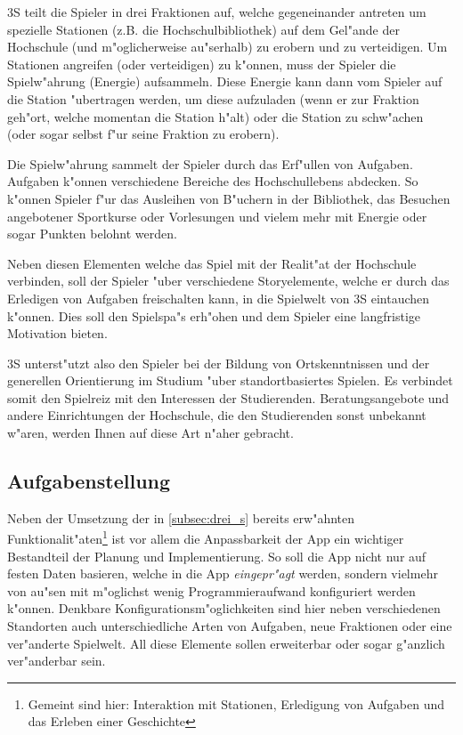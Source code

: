 \documentclass{article}
\begin{document}
3S teilt die Spieler in drei Fraktionen auf, welche gegeneinander antreten um spezielle Stationen (z.B. die Hochschulbibliothek) auf dem Gel"ande der Hochschule (und m"oglicherweise au"serhalb) zu erobern und zu verteidigen. Um Stationen angreifen (oder verteidigen) zu k"onnen, muss der Spieler die Spielw"ahrung (Energie) aufsammeln. Diese Energie kann dann vom Spieler auf die Station "ubertragen werden, um diese aufzuladen (wenn er zur Fraktion geh"ort, welche momentan die Station h"alt) oder die Station zu schw"achen (oder sogar selbst f"ur seine Fraktion zu erobern).

Die Spielw"ahrung sammelt der Spieler durch das Erf"ullen von Aufgaben. Aufgaben k"onnen verschiedene Bereiche des Hochschullebens abdecken. So k"onnen Spieler f"ur das Ausleihen von B"uchern in der Bibliothek, das Besuchen angebotener Sportkurse oder Vorlesungen und vielem mehr mit Energie oder sogar Punkten belohnt werden.

Neben diesen Elementen welche das Spiel mit der Realit"at der Hochschule verbinden, soll der Spieler "uber verschiedene Storyelemente, welche er durch das Erledigen von Aufgaben freischalten kann, in die Spielwelt von 3S eintauchen k"onnen. Dies soll den Spielspa"s erh"ohen und dem Spieler eine langfristige Motivation bieten.

3S unterst"utzt also den Spieler bei der Bildung von Ortskenntnissen und der generellen Orientierung im Studium "uber standortbasiertes Spielen. Es verbindet somit den Spielreiz mit den Interessen der Studierenden. Beratungsangebote und andere Einrichtungen der Hochschule, die den Studierenden sonst unbekannt w"aren, werden Ihnen auf diese Art n"aher gebracht.

\subsection{Aufgabenstellung}
\label{subsec:aufgabenstellung}
Neben der Umsetzung der in \ref{subsec:drei_s} bereits erw"ahnten Funktionalit"aten\footnote{Gemeint sind hier: Interaktion mit Stationen, Erledigung von Aufgaben und das Erleben einer Geschichte} ist vor allem die Anpassbarkeit der App ein wichtiger Bestandteil der Planung und Implementierung. So soll die App nicht nur auf festen Daten basieren, welche in die App \textit{eingepr"agt} werden, sondern vielmehr von au"sen mit m"oglichst wenig Programmieraufwand konfiguriert werden k"onnen. Denkbare Konfigurationsm"oglichkeiten sind hier neben verschiedenen Standorten auch unterschiedliche Arten von Aufgaben, neue Fraktionen oder eine ver"anderte Spielwelt. All diese Elemente sollen erweiterbar oder sogar g"anzlich ver"anderbar sein.
\end{document}
